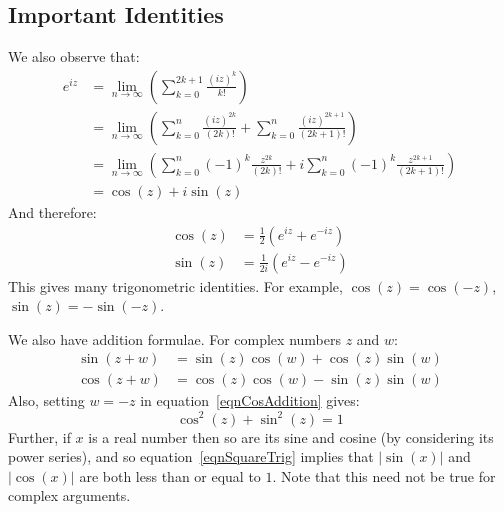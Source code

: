 \documentclass[../Main.tex]{subfiles}
\begin{document}
\subsection{Important Identities}
We also observe that:
\begin{align*}
    e^{iz} &= \lim_{n \to \infty} \left(\sum_{k = 0}^{2k + 1} \frac{(iz)^k}{k!}\right) \\
    &= \lim_{n \to \infty} \left(\sum_{k = 0}^n \frac{(iz)^{2k}}{(2k)!} + \sum_{k = 0}^n \frac{(iz)^{2k+1}}{(2k+1)!}\right) \\
    &= \lim_{n \to \infty} \left(\sum_{k = 0}^n (-1)^k \frac{z^{2k}}{(2k)!} + i\sum_{k = 0}^n (-1)^k \frac{z^{2k+1}}{(2k+1)!}\right) \\
    &= \cos(z) + i\sin(z)
\end{align*}
And therefore:
\begin{align*}
    \cos(z) &= \frac{1}{2} \left(e^{iz} + e^{-iz}\right) \\
    \sin(z) &= \frac{1}{2i} \left(e^{iz} - e^{-iz}\right)
\end{align*}
This gives many trigonometric identities. For example, $\cos(z) = \cos(-z)$, $\sin(z) = -\sin(-z)$.\par
We also have addition formulae. For complex numbers $z$ and $w$:
\begin{align}
    \sin(z + w) &= \sin(z) \cos(w) + \cos(z) \sin(w) \label{eqnSinAddition} \\
    \cos(z + w) &= \cos(z) \cos(w) - \sin(z) \sin(w) \label{eqnCosAddition}
\end{align}
Also, setting $w = -z$ in equation~\ref{eqnCosAddition} gives:
\begin{equation}
    \cos^2(z) + \sin^2(z) = 1
    \label{eqnSquareTrig}
\end{equation}
Further, if $x$ is a real number then so are its sine and cosine (by considering its power series), and so equation~\ref{eqnSquareTrig} implies that $|\sin(x)|$ and $|\cos(x)|$ are both less than or equal to $1$. Note that this need not be true for complex arguments.
\end{document}
